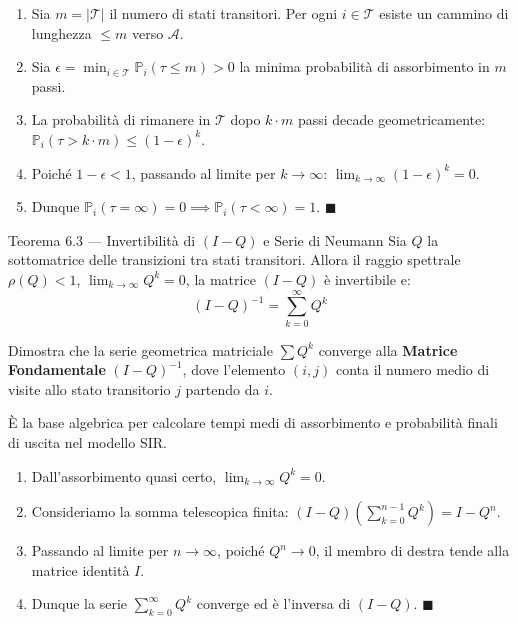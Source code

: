 \documentclass[11pt,a4paper]{report}
\newcommand{\PP}{\mathbb{P}}
\newcommand{\1}{\mathbf{1}}
\begin{document}
\begin{dimostrazione}
\begin{enumerate}
    \item Sia $m = |\mathcal{T}|$ il numero di stati transitori. Per ogni $i \in \mathcal{T}$ esiste un cammino di lunghezza $\le m$ verso $\mathcal{A}$.
    \item Sia $\epsilon = \min_{i \in \mathcal{T}} \PP_i(\tau \le m) > 0$ la minima probabilità di assorbimento in $m$ passi.
    \item La probabilità di rimanere in $\mathcal{T}$ dopo $k \cdot m$ passi decade geometricamente: $\PP_i(\tau > k \cdot m) \le (1 - \epsilon)^k$.
    \item Poiché $1 - \epsilon < 1$, passando al limite per $k \to \infty$: $\lim_{k \to \infty} (1-\epsilon)^k = 0$.
    \item Dunque $\PP_i(\tau = \infty) = 0 \implies \PP_i(\tau < \infty) = 1$. $\blacksquare$
\end{enumerate}
\end{dimostrazione}

\newpage

\begin{teoremabox}{Teorema 6.3 --- Invertibilità di $(I-Q)$ e Serie di Neumann}
Sia $Q$ la sottomatrice delle transizioni tra stati transitori. Allora il raggio spettrale $\rho(Q) < 1$, $\lim_{k \to \infty} Q^k = 0$, la matrice $(I-Q)$ è invertibile e:
\[ (I-Q)^{-1} = \sum_{k=0}^\infty Q^k \]
\end{teoremabox}

\begin{cosafa}
Dimostra che la serie geometrica matriciale $\sum Q^k$ converge alla \textbf{Matrice Fondamentale} $(I-Q)^{-1}$, dove l'elemento $(i,j)$ conta il numero medio di visite allo stato transitorio $j$ partendo da $i$.
\end{cosafa}

\begin{acosaserve}
È la base algebrica per calcolare tempi medi di assorbimento e probabilità finali di uscita nel modello SIR.
\end{acosaserve}

\begin{dimostrazione}
\begin{enumerate}
    \item Dall'assorbimento quasi certo, $\lim_{k \to \infty} Q^k = 0$.
    \item Consideriamo la somma telescopica finita: $(I - Q) \left( \sum_{k=0}^{n-1} Q^k \right) = I - Q^n$.
    \item Passando al limite per $n \to \infty$, poiché $Q^n \to 0$, il membro di destra tende alla matrice identità $I$.
    \item Dunque la serie $\sum_{k=0}^\infty Q^k$ converge ed è l'inversa di $(I-Q)$. $\blacksquare$
\end{enumerate}
\end{dimostrazione}
\end{document}
